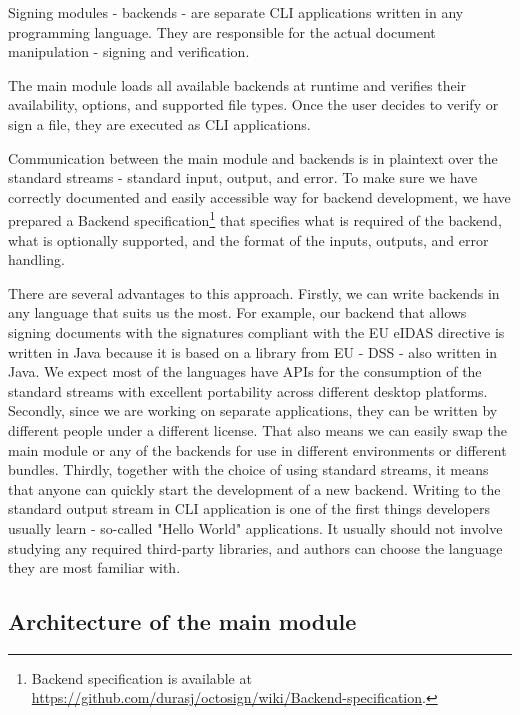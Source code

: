 \documentclass[thesismargins, english, thesislinespacing, onelinechapterstyle, upjsfrontpage]{rnthesis}
\begin{document}
Signing modules - backends - are separate CLI applications written in any programming language.
They are responsible for the actual document manipulation - signing and verification.

The main module loads all available backends at runtime and verifies their availability, options, and supported file types.
Once the user decides to verify or sign a file, they are executed as CLI applications.

Communication between the main module and backends is in plaintext over the standard streams - standard input, output, and error.
To make sure we have correctly documented and easily accessible way for backend development, we have prepared a Backend specification\footnote{Backend specification is available at \url{https://github.com/durasj/octosign/wiki/Backend-specification}.} that specifies what is required of the backend, what is optionally supported, and the format of the inputs, outputs, and error handling.

\iffalse %
TODO: Go a bit more over the backend specification here
\fi


There are several advantages to this approach.
Firstly, we can write backends in any language that suits us the most.
For example, our backend that allows signing documents with the signatures compliant with the EU eIDAS directive is written in Java because it is based on a library from EU - DSS - also written in Java.
We expect most of the languages have APIs for the consumption of the standard streams with excellent portability across different desktop platforms.
Secondly, since we are working on separate applications, they can be written by different people under a different license.
That also means we can easily swap the main module or any of the backends for use in different environments or different bundles.
Thirdly, together with the choice of using standard streams, it means that anyone can quickly start the development of a new backend.
Writing to the standard output stream in CLI application is one of the first things developers usually learn - so-called "Hello World" applications.
It usually should not involve studying any required third-party libraries, and authors can choose the language they are most familiar with.

\subsection{Architecture of the main module} \label{architecture}
\end{document}
